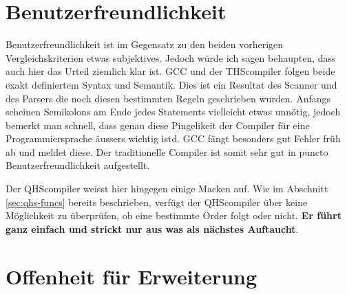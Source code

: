 \section{Benutzerfreundlichkeit}
Benutzerfreundlichkeit ist im Gegensatz zu den beiden vorherigen Vergleichskriterien etwas subjektives. Jedoch würde ich sagen behaupten, dass auch hier das Urteil ziemlich klar ist.
GCC und der THScompiler folgen beide exakt definiertem Syntax und Semantik. Dies ist ein Resultat des Scanner und des Parsers die noch diesen bestimmten Regeln geschrieben wurden.
Anfangs scheinen Semikolons am Ende jedes Statements vielleicht etwas unnötig, jedoch bemerkt man schnell, dass genau diese Pingelikeit der Compiler für eine Programmiersprache äussers wichtig istd.
GCC fängt besonders gut Fehler früh ab und meldet diese. Der traditionelle Compiler ist somit sehr gut in puncto Benutzerfreundlichkeit aufgestellt.

Der QHScompiler weisst hier hingegen einige Macken auf. Wie im Abschnitt \ref{sec:qhs-funcs} bereits beschrieben, verfügt der QHScompiler über keine Möglichkeit zu überprüfen, ob eine bestimmte Order folgt oder nicht.
\textbf{Er führt ganz einfach und strickt nur aus was als nächstes Auftaucht}.



\section{Offenheit für Erweiterung}